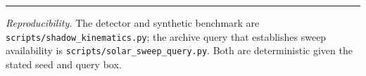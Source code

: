 \documentclass[11pt]{article}
\begin{document}
\medskip\hrule\medskip
\noindent\footnotesize\textit{Reproducibility.} The detector and synthetic benchmark are
\texttt{scripts/shadow\_kinematics.py}; the archive query that establishes sweep availability
is \texttt{scripts/solar\_sweep\_query.py}. Both are deterministic given the stated seed and
query box.

\printbibliography
\end{document}
